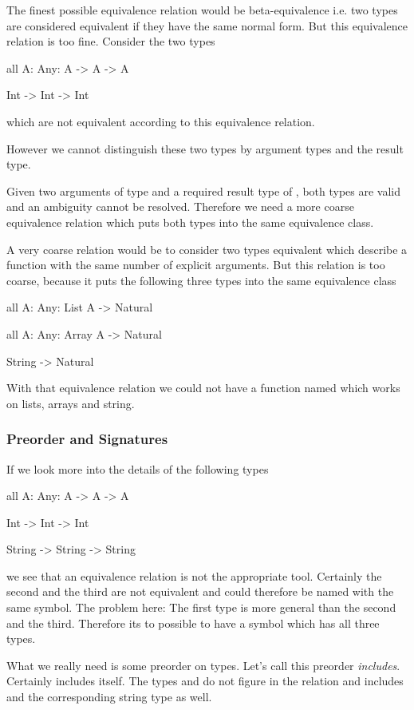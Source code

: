 The finest possible equivalence relation would be beta-equivalence i.e. two
types are considered equivalent if they have the same normal form. But this
equivalence relation is too fine. Consider the two types
%
\begin{alba}
    all {A: Any}: A -> A -> A

    Int -> Int -> Int
\end{alba}
%
which are not equivalent according to this equivalence relation.

However we cannot distinguish these two types by argument types and the result
type.

Given two arguments of type  and a required result type of ,
both types are valid and an ambiguity cannot be resolved. Therefore we need a
more coarse equivalence relation which puts both types into the same equivalence
class.

A very coarse relation would be to consider two types equivalent which describe
a function with the same number of explicit arguments. But this relation is too
coarse, because it puts the following three types into the same equivalence class
%
\begin{alba}
    all {A: Any}: List A -> Natural

    all {A: Any}: Array A -> Natural

    String -> Natural
\end{alba}
%
With that equivalence relation we could not have a function named 
which works on lists, arrays and string.



\subsubsection{Preorder and Signatures}

If we look more into the details of the following types
%
\begin{alba}
    all {A: Any}: A -> A -> A

    Int -> Int -> Int

    String -> String -> String
\end{alba}
%
we see that an equivalence relation is not the appropriate tool. Certainly the
second and the third are not equivalent and could therefore be named with the
same symbol. The problem here: The first type is more general than the second
and the third. Therefore its to possible to have a symbol which has all three
types.

What we really need is some preorder on types. Let's call this preorder
\emph{includes}. Certainly  includes itself. The types
 and  do not figure in
the relation and  includes  and the corresponding string type as well.

